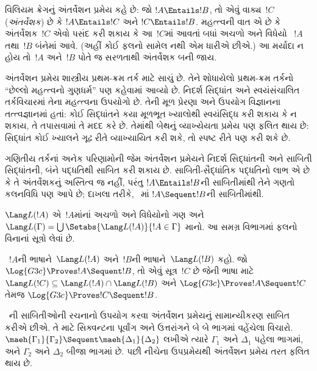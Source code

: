 \begingroup
\makeatletter{}\makeatother


\label{guunit:OLP-0658}


વિલિયમ ક્રેગનું અંતર્વેશન પ્રમેય કહે છે:
જો $!A \Entails !B$, તો એવું
વાક્ય~$!C$ (\emph{અંતર્વેશક}) છે કે
$!A \Entails !C$ અને $!C \Entails !B$.
મહત્ત્વની વાત એ છે કે અંતર્વેશક~$!C$
એવો પસંદ કરી શકાય કે આ~$!C$માં આવતાં
બધાં અચળો અને વિધેયો
~$!A$ તથા~$!B$ બંનેમાં આવે.
(અહીં કોઈ ફલનો સામેલ નથી એમ ધારીએ છીએ.)
આ મર્યાદા ન હોય તો~$!A$ અને~$!B$
પોતે જ સરળતાથી અંતર્વેશક બની જાય.

અંતર્વેશન પ્રમેય શાસ્ત્રીય પ્રથમ-ક્રમ
તર્ક માટે સાચું છે. તેને શોધાયેલો
પ્રથમ-ક્રમ તર્કનો ``છેલ્લો મહત્ત્વનો ગુણધર્મ''
પણ કહેવામાં આવ્યો છે.
નિદર્શ સિદ્ધાંત અને સ્વયંસંચાલિત
તર્કવિચારમાં તેના મહત્ત્વના ઉપયોગો છે.
તેની મૂળ પ્રેરણા અને ઉપયોગ વિજ્ઞાનના
તત્ત્વજ્ઞાનમાં હતાં: કોઈ સિદ્ધાંતને
કયા મૂળભૂત ખ્યાલોથી સ્વયંસિદ્ધ કરી શકાય
કે ન શકાય, તે તપાસવામાં તે મદદ કરે છે.
તેમાંથી બેથનું વ્યાખ્યેયતા પ્રમેય પણ
ફલિત થાય છે: સિદ્ધાંત કોઈ ખ્યાલને
ગૂઢ રીતે વ્યાખ્યાયિત કરી શકે,
તો સ્પષ્ટ રીતે પણ કરી શકે છે.

ગણિતીય તર્કનાં અનેક પરિણામોની જેમ
અંતર્વેશન પ્રમેયને નિદર્શ સિદ્ધાંતની
અને સાબિતી સિદ્ધાંતની, બંને પદ્ધતિથી
સાબિત કરી શકાય છે.
સાબિતી-સૈદ્ધાંતિક પદ્ધતિનો લાભ એ છે કે
તે અંતર્વેશકનું અસ્તિત્વ જ નહીં,
પરંતુ $!A \Entails !B$ની
સાબિતીમાંથી તેને ગણતો કલનવિધિ
પણ આપે છે; દાખલા તરીકે,
~માં
$!A \Sequent !B$ની સાબિતીમાંથી.

$\Lang L(!A)$ એ~$!A$માંનાં
અચળો અને વિધેયોનો ગણ
અને
$\Lang L(\Gamma) = \bigcup \Setabs{\Lang L(!A)}{!A \in
\Gamma}$ માનો. આ સમગ્ર વિભાગમાં
ફલનો વિનાનાં સૂત્રો
લેવાં છે.

\begin{thm}[ક્રેગનું અંતર્વેશન પ્રમેય]
~$!A$ની ભાષાને~$\Lang L(!A)$
અને~$!B$ની ભાષાને~$\Lang L(!B)$ કહો.
જો $\Log{G3c} \Proves !A \Sequent !B$,
તો એવું સૂત્ર~$!C$ છે
જેની ભાષા માટે
$\Lang L(!C) \subseteq \Lang
L(!A) \cap \Lang L(!B)$ અને
$\Log{G3c} \Proves !A \Sequent !C$
તેમજ
$\Log{G3c} \Proves !C \Sequent !B$.
\end{thm}

~ની સાબિતીઓની રચનાનો
ઉપયોગ કરવા અંતર્વેશન પ્રમેયનું
સામાન્યીકરણ સાબિત કરીએ છીએ.
તે માટે સિક્વન્ટના પૂર્વાંગ અને
ઉત્તરાંગને બે બે ભાગમાં વહેંચેલા
વિચારો. $\maeh{\Gamma_1}{\Gamma_2} \Sequent
\maeh{\Delta_1}{\Delta_2}$ લખીએ ત્યારે
$\Gamma_1$ અને $\Delta_1$ પહેલા ભાગમાં,
અને $\Gamma_2$ અને $\Delta_2$
બીજા ભાગમાં છે. પછી નીચેના ઉપપ્રમેયથી
અંતર્વેશન પ્રમેય તરત ફલિત થાય છે.

